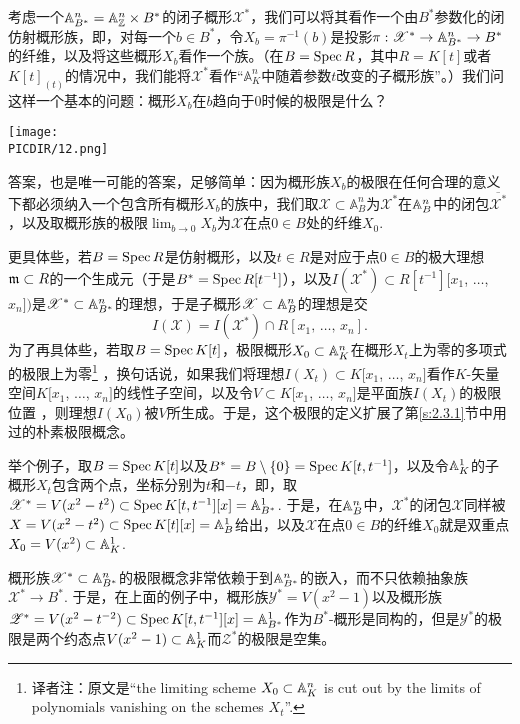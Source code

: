 考虑一个$\mathbb{A}_{B^*}^n=\mathbb{A}_{\mathbb{Z}}^n\times B^*$的闭子概形$\mathscr{X}^*$，我们可以将其看作一个由$B^*$参数化的闭仿射概形族，即，对每一个$b\in B^*$，令$X_b=\pi^{-1}(b)$是投影$\pi:\mathscr{X}^*\to \mathbb{A}_{B^*}^n\to B^*$的纤维，以及将这些概形$X_b$看作一个族。（在$B=\operatorname{Spec} R$，其中$R=K[t]$或者$K[t]_{(t)}$的情况中，我们能将$\mathscr{X}^*$看作“$\mathbb{A}_K^n$中随着参数$t$改变的子概形族”。）我们问这样一个基本的问题：概形$X_b$在$b$趋向于$0$时候的极限是什么？

\begin{center}\texttt{[image: \\PICDIR/12.png]}\end{center}

答案，也是唯一可能的答案，足够简单：因为概形族$X_b$的极限在任何合理的意义下都必须纳入一个包含所有概形$X_b$的族中，我们取$\mathscr{X}\subset \mathbb{A}_B^n$为$\mathscr{X}^*$在$\mathbb{A}_B^n$中的闭包$\overline{\mathscr{X}^*}$，以及取概形族的极限$\lim_{b\to 0}X_b$为$\mathscr{X}$在点$0\in B$处的纤维$X_0$.

更具体些，若$B=\operatorname{Spec} R$是仿射概形，以及$t\in R$是对应于点$0\in B$的极大理想$\mathfrak{m}\subset R$的一个生成元（于是$B^*=\operatorname{Spec} R[t^{-1}]$），以及$I(\mathscr{X}^*)\subset R[t^{-1}][x_1$, $\dots$, $x_n])$是$\mathscr{X}^*\subset \mathbb{A}_{B^*}^n$的理想，于是子概形$\mathscr{X}\subset \mathbb{A}_{B}^n$的理想是交
\[
	I(\mathscr{X})=I(\mathscr{X}^*)\cap R[x_1,\,\dots,\,x_n].
\]
为了再具体些，若取$B=\operatorname{Spec} K[t]$，极限概形$X_0\subset \mathbb{A}_K^n$在概形$X_t$上为零的多项式的极限上为零\footnote{译者注：原文是``the limiting scheme $X_0\subset \mathbb{A}_K^n$ is cut out by the limits of polynomials vanishing on the schemes $X_t$''.} ，换句话说，如果我们将理想$I(X_t)\subset K[x_1$, $\dots$, $x_n]$看作$K$\hyp 矢量空间$K[x_1$, $\dots$, $x_n]$的线性子空间，以及令$V\subset K[x_1$, $\dots$, $x_n]$是平面族$I(X_t)$的极限位置 ，则理想$I(X_0)$被$V$所生成。于是，这个极限的定义扩展了第\ref{s:2.3.1}节中用过的朴素极限概念。

举个例子，取$B=\operatorname{Spec} K[t]$以及$B^*=B\setminus \{0\}=\operatorname{Spec} K[t,t^{-1}]$，以及令$\mathbb{A}_K^1$的子概形$X_t$包含两个点，坐标分别为$t$和$-t$，即，取$\mathscr{X}^*=V(x^2-t^2)\subset \operatorname{Spec} K[t,t^{-1}][x]=\mathbb{A}_{B^*}^1$. 于是，在$\mathbb{A}_B^n$中，$\mathscr{X}^*$的闭包$\mathscr{X}$同样被$X=V(x^2-t^2)\subset \operatorname{Spec} K[t][x]=\mathbb{A}_B^1$给出，以及$\mathscr{X}$在点$0\in B$的纤维$X_0$就是双重点$X_0=V(x^2)\subset\mathbb{A}_K^1$.

概形族$\mathscr{X}^*\subset \mathbb{A}_{B^*}^n$的极限概念非常依赖于到$\mathbb{A}_{B^*}^n$的嵌入，而不只依赖抽象族$\mathscr{X}^*\to B^*$. 于是，在上面的例子中，概形族$\mathscr{Y}^*=V(x^2-1)$以及概形族$\mathscr{Z}^*=V(x^2-t^{-2})\subset \operatorname{Spec} K[t,t^{-1}][x]=\mathbb{A}_{B^*}^1$作为$B^*$\hyp 概形是同构的，但是$\mathscr{Y}^*$的极限是两个约态点$V(x^2-1)\subset \mathbb{A}^1_K$而$\mathscr{Z}^*$的极限是空集。

